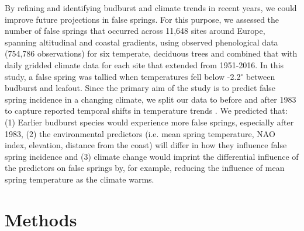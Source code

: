 \documentclass{article}\usepackage[]{graphicx}\usepackage[]{color}
\begin{document}
By refining and identifying budburst and climate trends in recent years, we could improve future projections in false springs. For this purpose, we assessed the number of false springs that occurred across 11,648 sites around Europe, spanning altitudinal and coastal gradients, using observed phenological data (754,786 observations) for six temperate, deciduous trees and combined that with daily gridded climate data for each site that extended from 1951-2016. In this study, a false spring was tallied when temperatures fell below -2.2$^{\circ}$ \citep{Schwartz1993} between budburst and leafout. Since the primary aim of the study is to predict false spring incidence in a changing climate, we split our data to before and after 1983 to capture reported temporal shifts in temperature trends \citep{Kharouba2018, Stocker2013}. We predicted that: (1) Earlier budburst species would experience more false springs, especially after 1983, (2) the environmental predictors (i.e. mean spring temperature, NAO index, elevation, distance from the coast) will differ in how they influence false spring incidence and (3) climate change would imprint the differential influence of the predictors on false springs by, for example, reducing the influence of mean spring temperature as the climate warms. 


\section*{Methods}
\end{document}
